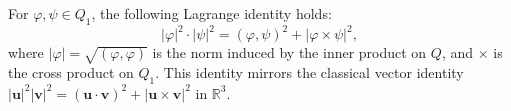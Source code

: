 For $\varphi, \psi \in Q_1$, the following Lagrange identity holds:
$$
|\varphi|^2 \cdot |\psi|^2 = (\varphi, \psi)^2 + |\varphi \times \psi|^2,
$$
where $|\varphi| = \sqrt{(\varphi, \varphi)}$ is the norm induced by the inner product on $Q$, and $\times$ is the cross product on $Q_1$. This identity mirrors the classical vector identity $|\mathbf{u}|^2 |\mathbf{v}|^2 = (\mathbf{u} \cdot \mathbf{v})^2 + |\mathbf{u} \times \mathbf{v}|^2$ in $\mathbb{R}^3$.
